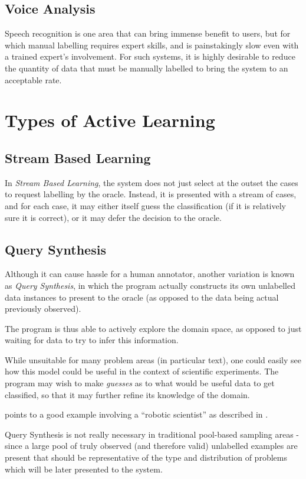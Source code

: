 \documentclass[a4paper,11pt]{report}
\begin{document}
\subsection{Voice Analysis}

Speech recognition is one area that can bring immense benefit to users, but for which manual labelling requires expert skills, and is painstakingly slow even with a trained expert's involvement. For such systems, it is highly desirable to reduce the quantity of data that must be manually labelled to bring the system to an acceptable rate.

\section{Types of Active Learning}
\subsection{Stream Based Learning}
In \emph{Stream Based Learning}, the system does not just select at the outset the cases to request labelling by the oracle. Instead, it is presented with a stream of cases, and for each case, it may either itself guess the classification (if it is relatively sure it is correct), or it may defer the decision to the oracle.

\subsection{Query Synthesis}
Although it can cause hassle for a human annotator, another variation is known as \emph{Query Synthesis}, in which the program actually constructs its own unlabelled data instances to present to the oracle (as opposed to the data being actual previously observed).

The program is thus able to actively explore the domain space, as opposed to just waiting for data to try to infer this information.

While unsuitable for many problem areas (in particular text), one could easily see how this model could be useful in the context of scientific experiments. The program may wish to make \emph{guesses} as to what would be useful data to get classified, so that it may further refine its knowledge of the domain.

\citet{Settles2010} points to a good example involving a ``robotic scientist'' as described in \citet{King2009}.

Query Synthesis is not really necessary in traditional pool-based sampling areas - since a large pool of truly observed (and therefore valid) unlabelled examples are present that should be representative of the type and distribution of problems which will be later presented to the system.
\end{document}
